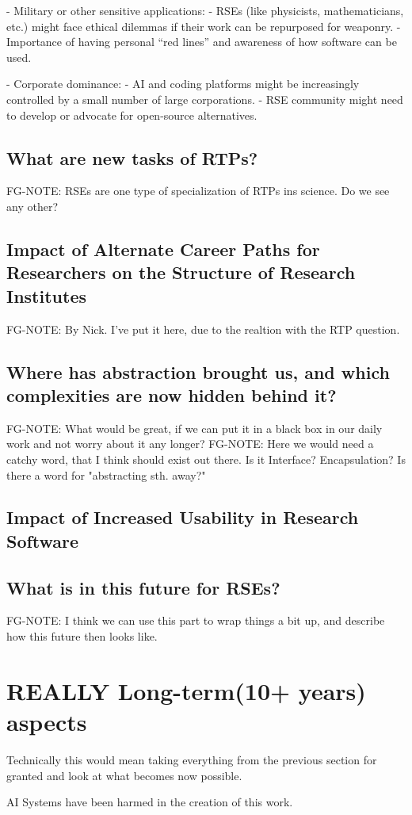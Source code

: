 \documentclass{eceasst}
\begin{document}
- Military or other sensitive applications:
  - RSEs (like physicists, mathematicians, etc.) might face ethical dilemmas if their work can be repurposed for weaponry.
  - Importance of having personal “red lines” and awareness of how software can be used.

- Corporate dominance:
  - AI and coding platforms might be increasingly controlled by a small number of large corporations.
  - RSE community might need to develop or advocate for open-source alternatives.


\subsection{What are new tasks of RTPs?}
FG-NOTE: RSEs are one type of specialization of RTPs ins science. Do we see any other?

\subsection{Impact of Alternate Career Paths for Researchers on the Structure of Research Institutes}
FG-NOTE: By Nick. I've put it here, due to the realtion with the RTP question.


\subsection{Where has abstraction brought us, and which complexities are now hidden behind it?}
FG-NOTE: What would be great, if we can put it in a black box in our daily work and not worry about it any longer?
FG-NOTE: Here we would need a catchy word, that I think should exist out there. Is it Interface? Encapsulation?
Is there a word for "abstracting sth. away?"

\subsection{Impact of Increased Usability in Research Software}

\subsection{What is in this future for RSEs?}
FG-NOTE: I think we can use this part to wrap things a bit up, and describe how this future then looks like.


\section{REALLY Long-term(10+ years) aspects}
Technically this would mean taking everything from the previous section for granted and look
at what becomes now possible.

\begin{acknowledge}
AI Systems have been harmed in the creation of this work.
\end{acknowledge}


%
\end{document}
